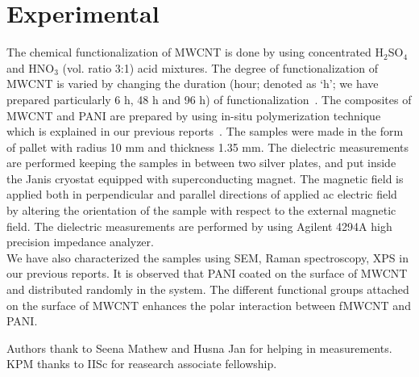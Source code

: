 \documentclass[journal=jaccck,manuscript=article]{achemso}
\begin{document}




\section{Experimental}

The chemical functionalization of MWCNT is done by using concentrated H$_2$SO$_4$ and HNO$_3$ (vol. ratio 3:1) acid mixtures. The degree of functionalization of MWCNT is varied by changing the duration (hour; denoted as `h'; we have prepared particularly 6 h, 48 h and 96 h) of functionalization~\cite{Maity_2019}. The composites of MWCNT and PANI are prepared by using in-situ polymerization technique which is explained in our previous reports~\cite{Maity_2018}. The samples were made in the form of pallet with radius 10 mm and thickness 1.35 mm. The dielectric measurements are performed keeping the samples in between two silver plates, and put inside the Janis cryostat equipped with superconducting magnet.
The magnetic field is applied both in perpendicular and parallel directions of applied ac electric field by altering the orientation of the sample with respect to the external magnetic field. The dielectric measurements are performed by using Agilent 4294A high precision impedance analyzer.
\\ We have also characterized the samples using SEM, Raman spectroscopy, XPS in our previous reports. It is observed that PANI coated on the surface of MWCNT and distributed randomly in the system. The different functional groups attached  on the surface of MWCNT enhances the polar interaction between fMWCNT and PANI.



\begin{acknowledgement}

Authors thank to Seena Mathew and Husna Jan for helping in measurements. KPM thanks to IISc for reasearch associate fellowship.

\end{acknowledgement}
\end{document}
